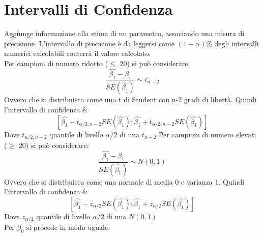 \section{Intervalli di Confidenza}
Aggiunge informazione alla stima di un parametro, associando una misura di 
precisione. L'intervallo di precisione \`e da leggersi come $(1-\alpha) \% $ 
degli intervalli numerici calcolabili conterr\`a il valore calcolato.\\
Per campioni di numero ridotto ($\le$ 20) si pu\`o considerare:
\[ \frac{\hat{\beta_1} - \beta_1}{SE(\hat{\beta_1})} \sim t_{n-2} \]
Ovvero che si distribuisca come una t di Student con n-2 gradi di libert\`a. 
Quindi l'intervallo di confidenza \'e:
\[ [ \hat{\beta_1} - t_{\alpha/2, n-2} SE(\hat{\beta_1}) ; \hat{\beta_1} + 
t_{\alpha/2, n-2} SE(\hat{\beta_1}) ] \]
Dove $t_{\alpha/2, n-2}$ quantile di livello $\alpha/2$ di una $t_{n-2}$
Per campioni di numero elevati ($\ge$ 20) si pu\`o considerare:
\[ \frac{\hat{\beta_1} - \beta_1}{SE(\hat{\beta_1})} \sim N(0,1) \]
Ovvero che si distribuisca come una normale di media 0 e varianza 1. 
Quindi l'intervallo di confidenza \'e:
\[ [ \hat{\beta_1} - z_{\alpha/2} SE(\hat{\beta_1}) ; \hat{\beta_1} +  
z_{\alpha/2} SE(\hat{\beta_1}) ] \]
Dove $z_{\alpha/2}$ quantile di livello $\alpha/2$ di una $N(0,1)$
\\ Per $\beta_0$ si procede in modo uguale.